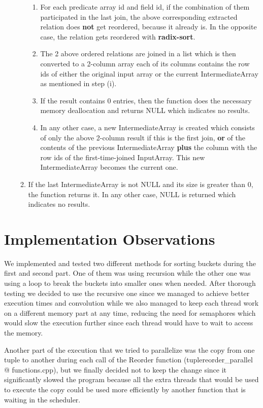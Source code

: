 \documentclass{ws-ijprai}
\begin{document}
\begin{enumerate}
\begin{enumerate}
\begin{enumerate}
            \item For each predicate array id and field id, if the combination of them participated in the last join, the above corresponding extracted relation does \textbf{not} get reordered, because it already is. In the opposite case, the relation gets reordered with \textbf{radix-sort}.
            \item The 2 above ordered relations are joined in a list which is then converted to a 2-column array each of its columns contains the row ids of either the original input array or the current IntermediateArray as mentioned in step (i).
            \item If the result contains 0 entries, then the function does the necessary memory deallocation and returns NULL which indicates no results.
            \item In any other case, a new IntermediateArray is created which consists of only the above 2-column result if this is the first join, \textbf{or} of the contents of the previous IntermediateArray \textbf{plus} the column with the row ids of the first-time-joined InputArray. This new IntermediateArray becomes the current one.
        \end{enumerate}
        \item If the last IntermediateArray is not NULL and its size is greater than 0, the function returns it. In any other case, NULL is returned which indicates no results.
    \end{enumerate}
\end{enumerate}


\section{Implementation Observations}

\tab We implemented and tested two different methods for sorting buckets during the first and second part. One of them was using recursion while the other one was using a loop to break the buckets into smaller ones when needed. After thorough testing we decided to use the recursive one since we managed to achieve better execution times and convolution while we also managed to keep each thread work on a different memory part at any time, reducing the need for semaphores which would slow the execution further since each thread would have to wait to access the memory.

\tab Another part of the execution that we tried to parallelize was the copy from one tuple to another during each call of the Reorder function (tuplereorder\_parallel @ functions.cpp), but we finally decided not to keep the change since it significantly slowed the program because all the extra threads that would be used to execute the copy could be used more efficiently by another function that is waiting in the scheduler.
\end{document}
